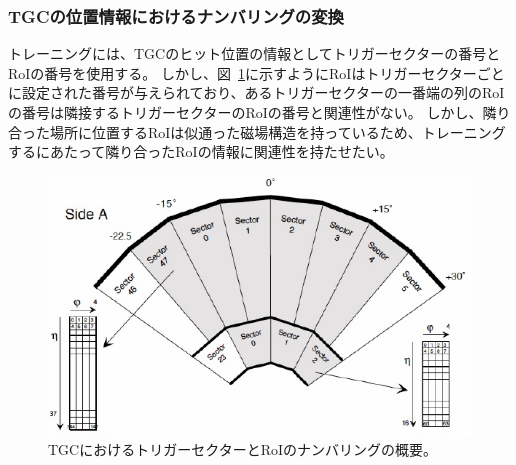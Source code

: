 

\subsubsection{TGCの位置情報におけるナンバリングの変換}
トレーニングには、TGCのヒット位置の情報としてトリガーセクターの番号とRoIの番号を使用する。
しかし、図~\ref{fig:TGCnumbering}に示すようにRoIはトリガーセクターごとに設定された番号が与えられており、あるトリガーセクターの一番端の列のRoIの番号は隣接するトリガーセクターのRoIの番号と関連性がない。
しかし、隣り合った場所に位置するRoIは似通った磁場構造を持っているため、トレーニングするにあたって隣り合ったRoIの情報に関連性を持たせたい。

\begin{figure}[tb]
  \centering
  \includegraphics[clip, width=12cm]{fig/4/TGC_numbering.pdf}
  \caption{TGCにおけるトリガーセクターとRoIのナンバリングの概要\cite{Lellouch:684103}。}
  \label{fig:TGCnumbering}
\end{figure}

